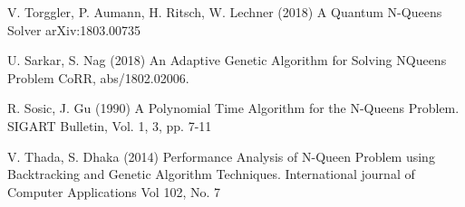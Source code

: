 \documentclass[conference]{IEEEtran}
\begin{document}
\begin{thebibliography}{99.}
 V. Torggler, P. Aumann, H. Ritsch, W. Lechner (2018) A Quantum N-Queens Solver arXiv:1803.00735 

 U. Sarkar, S. Nag (2018) An Adaptive Genetic Algorithm for Solving NQueens Problem CoRR, abs/1802.02006.

 R. Sosic, J. Gu (1990) A Polynomial Time Algorithm for the N-Queens Problem. SIGART Bulletin, Vol. 1, 3, pp. 7-11

 V. Thada, S. Dhaka (2014) Performance Analysis of N-Queen Problem using Backtracking and Genetic Algorithm Techniques. International journal of Computer Applications Vol 102, No. 7


\end{thebibliography}
\end{document}
